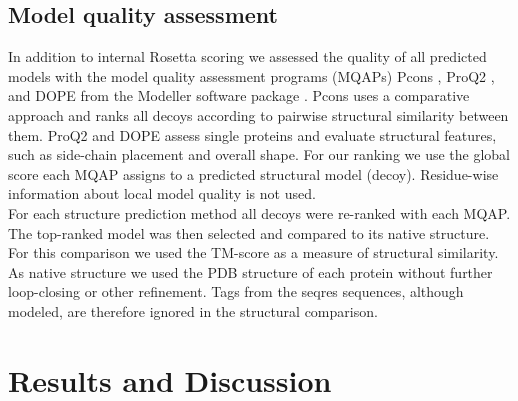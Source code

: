 \documentclass{bioinfo}
\begin{document}
\begin{methods}
\subsection{Model quality assessment}
In addition to internal Rosetta scoring we assessed the quality of all predicted models with the model quality assessment programs (MQAPs) Pcons \cite[]{lundstrom_pcons:_2001}, ProQ2 \cite[]{ray_improved_2012}, and DOPE from the Modeller software package \cite[]{eswar_comparative_2006}. Pcons uses a comparative approach and ranks all decoys according to pairwise structural similarity between them. ProQ2 and DOPE assess single proteins and evaluate structural features, such as side-chain placement and overall shape. For our ranking we use the global score each MQAP assigns to a predicted structural model (decoy). Residue-wise information about local model quality is not used. \\\indent
For each structure prediction method all decoys were re-ranked with each MQAP. The top-ranked model was then selected and compared to its native structure. For this comparison we used the TM-score \cite[]{zhang_scoring_2004} as a measure of structural similarity. As native structure we used the PDB structure of each protein without further loop-closing or other refinement. Tags from the seqres sequences, although modeled, are therefore ignored in the structural comparison.




\end{methods}

\section{Results and Discussion}
\end{document}
